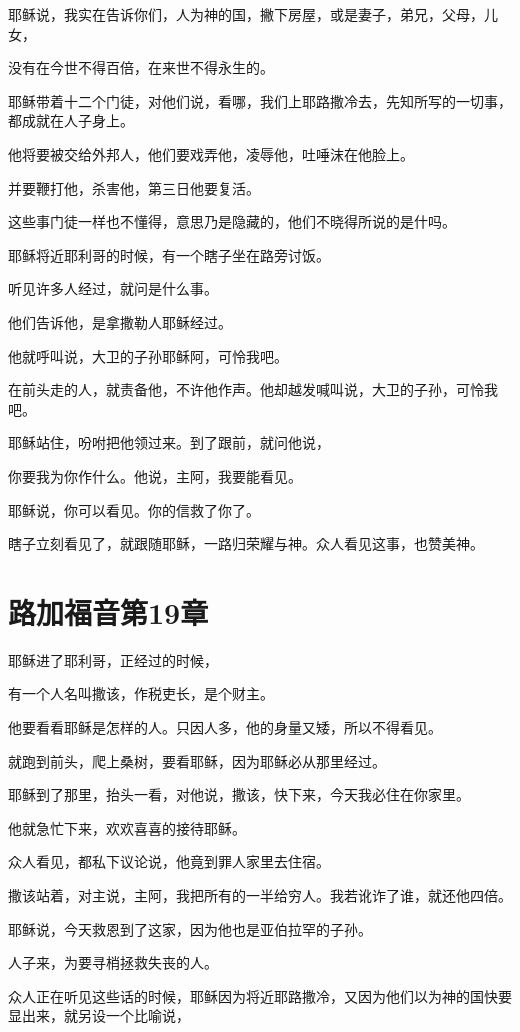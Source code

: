 \documentclass[12pt,oneside]{book}
\begin{document}
耶稣说，我实在告诉你们，人为神的国，撇下房屋，或是妻子，弟兄，父母，儿女，

没有在今世不得百倍，在来世不得永生的。

耶稣带着十二个门徒，对他们说，看哪，我们上耶路撒冷去，先知所写的一切事，都成就在人子身上。

他将要被交给外邦人，他们要戏弄他，凌辱他，吐唾沫在他脸上。

并要鞭打他，杀害他，第三日他要复活。

这些事门徒一样也不懂得，意思乃是隐藏的，他们不晓得所说的是什吗。

耶稣将近耶利哥的时候，有一个瞎子坐在路旁讨饭。

听见许多人经过，就问是什么事。

他们告诉他，是拿撒勒人耶稣经过。

他就呼叫说，大卫的子孙耶稣阿，可怜我吧。

在前头走的人，就责备他，不许他作声。他却越发喊叫说，大卫的子孙，可怜我吧。

耶稣站住，吩咐把他领过来。到了跟前，就问他说，

你要我为你作什么。他说，主阿，我要能看见。

耶稣说，你可以看见。你的信救了你了。

瞎子立刻看见了，就跟随耶稣，一路归荣耀与神。众人看见这事，也赞美神。

\chapter{路加福音第19章}
耶稣进了耶利哥，正经过的时候，

有一个人名叫撒该，作税吏长，是个财主。

他要看看耶稣是怎样的人。只因人多，他的身量又矮，所以不得看见。

就跑到前头，爬上桑树，要看耶稣，因为耶稣必从那里经过。

耶稣到了那里，抬头一看，对他说，撒该，快下来，今天我必住在你家里。

他就急忙下来，欢欢喜喜的接待耶稣。

众人看见，都私下议论说，他竟到罪人家里去住宿。

撒该站着，对主说，主阿，我把所有的一半给穷人。我若讹诈了谁，就还他四倍。

耶稣说，今天救恩到了这家，因为他也是亚伯拉罕的子孙。

人子来，为要寻梢拯救失丧的人。

众人正在听见这些话的时候，耶稣因为将近耶路撒冷，又因为他们以为神的国快要显出来，就另设一个比喻说，
\end{document}
